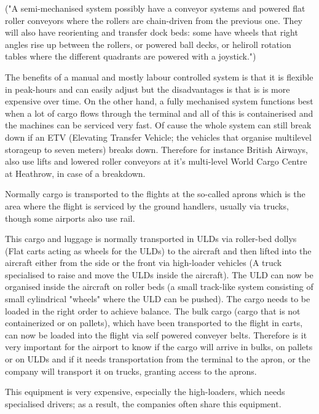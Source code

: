 ("A semi-mechanised system possibly have a conveyor systems and powered flat roller conveyors where the rollers are chain-driven from the previous one. They will also have reorienting and transfer dock beds: some have wheels that right angles rise up between the rollers, or powered ball decks, or heliroll rotation tables where the different quadrants are powered with a joystick.") %

The benefits of a manual and mostly labour controlled system is that it is flexible in peak-hours and can easily adjust but the  disadvantages is that is is more expensive over time.
On the other hand, a fully mechanised system functions best when a lot of cargo flows through the terminal and all of this is containerised and the machines can be serviced very fast. Of cause the whole system can still break down if an ETV (Elevating Transfer Vehicle; the vehicles that organise multilevel storageup to seven meters) breaks down.  Therefore for instance British Airways, also use lifts and lowered roller conveyors at it's multi-level World Cargo Centre at Heathrow, in case of a breakdown.

Normally cargo is transported to the flights at the so-called aprons which is the area where the flight is serviced by the ground handlers, usually via trucks, though some airports also use rail.

This cargo and luggage is normally transported in ULDs via roller-bed dollys (Flat carts acting as wheels for the ULDs) to the aircraft and then lifted into the aircraft either from the side or the front via high-loader vehicles (A truck specialised to raise and move the ULDs inside the aircraft).
The ULD can now be organised inside the aircraft on roller beds (a small track-like system consisting of small cylindrical "wheels" where the ULD can be pushed). The cargo needs to be loaded in the right order to achieve balance. The bulk cargo (cargo that is not containerized or on pallets), which have been transported to the flight in carts, can now be loaded into the flight via self powered conveyer belts. Therefore is it very important for the airport to know if the cargo will arrive in bulks, on pallets or on ULDs and if it needs transportation from the terminal to the apron, or the company will transport it on trucks, granting access to the aprons.

This equipment is very expensive, especially the high-loaders, which needs specialised drivers; as a result, the companies often share this equipment.

